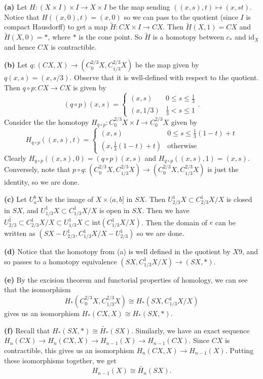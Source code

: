 \documentclass[11pt,letterpaper]{article}
\begin{document}
\begin{solution}
    \textbf{(a)} Let $H : (X\times I)\times I \to X\times I$ be the map sending $((x,s),t) \mapsto (x,st)$. Notice that $H((x,0), t)=(x,0)$ so we can pass to the quotient (since $I$ is compact Hausdorff) to get a map $\widetilde{H} : CX\times I \to CX$. Then $\widetilde{H}(X,1)=CX$ and $\widetilde{H}(X,0)=*$, where $*$ is the cone point. So $\widetilde{H}$ is a homotopy between $c_*$ and $\text{id}_X$ and hence $CX$ is contractible.
    
    \textbf{(b)} Let $q : (CX,X) \to (C^{2/3}_0X, C^{2 /3}_{1 /3}X)$ be the map given by $q(x,s)=(x,s /3)$. Observe that it is well-defined with respect to the quotient. Then $q\circ p : CX \to CX$ is given by
    \[
        (q\circ p)(x,s)=\begin{cases}
            (x,s)&0\leq s\leq \frac{1}{3}\\
            (x,1 /3)&\frac{1}{3}<s\leq 1
        \end{cases}
    .\] 
    Consider the the homotopy $H_{q\circ p} : C_0^{2 /3}X\times I \to C_0^{2 /3}X$ given by \[H_{q\circ p}((x,s),t)=\begin{cases}
        (x,s)&0\leq s\leq \frac{1}{3}(1-t) + t\\
        (x,\frac{1}{3}(1-t) + t) & \text{otherwise}
    \end{cases}\]  
    Clearly $H_{q\circ p}((x,s),0)=(q\circ p)(x,s)$ and $H_{q\circ p}((x,s),1)=(x,s)$. Conversely, note that $p\circ q : (C_0^{2 /3}X, C^{2 /3}_{1 /3}X) \to (C_0^{2 /3}X, C^{2 /3}_{1 /3}X)$ is just the identity, so we are done.

    \textbf{(c)} Let $U^b_aX$ be the image of $X\times (a,b]$ in $SX$. Then $U^1_{2 /3}X\subset C^1_{2 /3}X /X$ is closed in $SX$, and $U^1_{1 /3}X \subset C^1_{1 /3}X/X$ is open in $SX$. Then we have $\overline{U^1_{2 /3}} \subset C^1_{2 /3}X /X\subset U^1_{1 /3}X\subset \text{int}(C^1_{1 /3}X /X)$. Then the domain of $e$ can be written as $(SX-U^1_{2 /3}, C^1_{1 /3}X /X - U^{1}_{2 /3})$ so we are done.     

    \textbf{(d)} Notice that the homotopy from (a) is well defined in the quotient by $X$9, and so passes to a homotopy equivalence $(SX, C^1_{1 /3}X /X) \to (SX,*)$.
    
    \textbf{(e)} By the excision theorem and functorial properties of homology, we can see that the isomorphism \[H_*(C^{2/3}_0X, C^{2 /3}_{1 /3}X) \cong H_*(SX, C^1_{1 /3}X /X)\] gives us an isomorphism $H_*(CX,X)\cong H_*(SX,*)$.

    \textbf{(f)} Recall that $H_*(SX,*)\cong \widetilde{H_*}(SX)$. Similarly, we have an exact sequence $H_n(CX) \to H_n(CX,X) \to H_{n-1}(X) \to H_{n-1}(CX)$. Since $CX$ is contractible, this gives us an isomorphism $H_n(CX,X)\to H_{n-1}(X)$. Putting these isomorphisms together, we get
    \[
        H_{n-1}(X)\cong \widetilde{H_n}(SX)
    .\] 
\end{solution}
\end{document}
